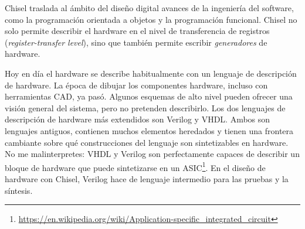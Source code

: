 \documentclass[%
    10pt,
    headinclude, footinclude=false,
    openright, %
    notitlepage,
    cleardoublepage=empty,
    headsepline,
    numbers=noenddot,
    bibliography=totoc, index=totoc,
    ]{scrbook}
\newcommand{\myref}[2]{\href{#1}{#2}}
\renewcommand{\myref}[2]{{#2}{\footnote{\url{#1}}}}
\begin{document}

Chisel traslada al ámbito del diseño digital avances de la ingeniería del software, como la programación orientada a objetos y 
la programación funcional. Chisel no solo permite describir el hardware en el nivel de transferencia de registros 
(\emph{register-transfer level}), sino que también permite escribir \emph{generadores} de hardware.


Hoy en día el hardware se describe habitualmente con un lenguaje de descripción de hardware.
La época de dibujar los componentes hardware, incluso con herramientas CAD, ya
pasó. Algunos esquemas de alto nivel pueden ofrecer una visión general del sistema, pero no
pretenden describirlo.
Los dos lenguajes de descripción de hardware más extendidos son Verilog y VHDL.
Ambos son lenguajes antiguos, contienen muchos elementos heredados y tienen una frontera cambiante sobre qué
construcciones del lenguaje son sintetizables en hardware.
No me malinterpretes: VHDL y Verilog son perfectamente capaces de describir un bloque de hardware
que puede sintetizarse en un
\myref{https://en.wikipedia.org/wiki/Application-specific_integrated_circuit}{ASIC}.
En el diseño de hardware con Chisel, Verilog hace de lenguaje intermedio
para las pruebas y la síntesis.
\end{document}
